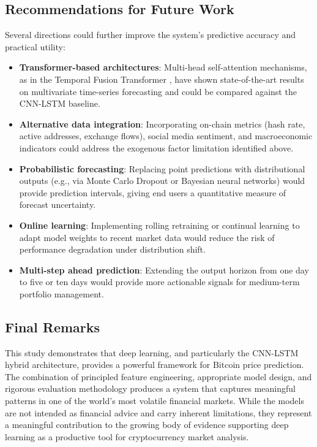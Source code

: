 \documentclass[12pt]{article}
\begin{document}
\subsection{Recommendations for Future Work}

Several directions could further improve the system's predictive accuracy and practical utility:

\begin{itemize}[leftmargin=*]
    \item \textbf{Transformer-based architectures}: Multi-head self-attention mechanisms, as in the Temporal Fusion Transformer \cite{lim2021}, have shown state-of-the-art results on multivariate time-series forecasting and could be compared against the CNN-LSTM baseline.
    \item \textbf{Alternative data integration}: Incorporating on-chain metrics (hash rate, active addresses, exchange flows), social media sentiment, and macroeconomic indicators could address the exogenous factor limitation identified above.
    \item \textbf{Probabilistic forecasting}: Replacing point predictions with distributional outputs (e.g., via Monte Carlo Dropout or Bayesian neural networks) would provide prediction intervals, giving end users a quantitative measure of forecast uncertainty.
    \item \textbf{Online learning}: Implementing rolling retraining or continual learning to adapt model weights to recent market data would reduce the risk of performance degradation under distribution shift.
    \item \textbf{Multi-step ahead prediction}: Extending the output horizon from one day to five or ten days would provide more actionable signals for medium-term portfolio management.
\end{itemize}

\subsection{Final Remarks}

This study demonstrates that deep learning, and particularly the CNN-LSTM hybrid architecture, provides a powerful framework for Bitcoin price prediction. The combination of principled feature engineering, appropriate model design, and rigorous evaluation methodology produces a system that captures meaningful patterns in one of the world's most volatile financial markets. While the models are not intended as financial advice and carry inherent limitations, they represent a meaningful contribution to the growing body of evidence supporting deep learning as a productive tool for cryptocurrency market analysis.
\end{document}
